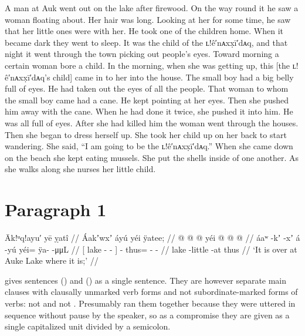 A man at Auk went out on the lake after firewood.
On the way round it he saw a woman floating about.
Her hair was long.
Looking at her for some time, he saw that her little ones were with her.
He took one of the children home.
When it became dark they went to sleep.
It was the child of the ʟ!ê′nᴀxx̣ī′dᴀq, and that night it went through the town picking out people’s eyes.
Toward morning a certain woman bore a child.
In the morning, when she was getting up, this [the ʟ!ê′nᴀxx̣ī′dᴀq’s child] came in to her into the house.
The small boy had a big belly full of eyes.
He had taken out the eyes of all the people.
That woman to whom the small boy came had a cane.
He kept pointing at her eyes.
Then she pushed him away with the cane.
When he had done it twice, she pushed it into him.
He was all full of eyes.
After she had killed him the woman went through the
houses.
Then she began to dress herself up.
She took her child up on her back to start wandering.
She said, “I am going to be the ʟ!ê′nᴀxx̣ī′dᴀq.”
When she came down on the beach she kept eating mussels.
She put the shells inside of one another.
As she walks along she nurses her little child.

\section{Paragraph 1}\label{sec:94-para-1}

\ex\label{ex:94-1-at-auke-lake}%
%
\begingl
	\glpreamble	Āk!ᵘq!ayu′ yē ỵatî //
	\glpreamble	Áakʼwxʼ áyú yéi ÿatee; //
	\gla	{}  @ {} @ {} {}  @ {}
		yéi @  @ {} @ {} //
	\glb	{} áaʷ -kʼ -xʼ {} á -yú
		yéi= ÿa-  -μμL //
	\glc	{}[ lake - - {}]  -
		thus= -  - //
	\gld	{} lake -little -at {}  {}
		thus  {} {} //
	\glft	‘It is over at Auke Lake where it is;’
		//
\endgl
\xe

\citeauthor{swanton:1909} gives sentences (\lastx) and (\nextx) as a single sentence.
They are however separate main clauses with clausally unmarked verb forms and not subordinate-marked forms of verbs:  not  and  not .
Presumably \citeauthor{swanton:1909} ran them together because they were uttered in sequence without pause by the speaker, so as a compromise they are given as a single capitalized unit divided by a semicolon.

